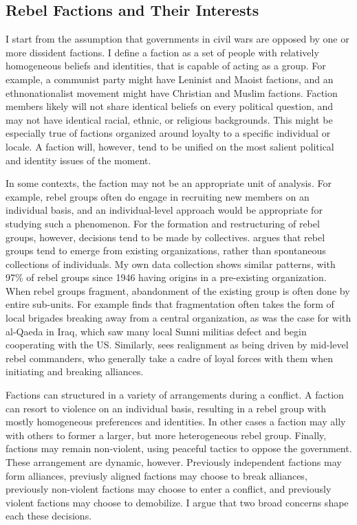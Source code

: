 \documentclass[12pt,]{book}
\begin{document}
\subsection{Rebel Factions and Their
Interests}\label{rebel-factions-and-their-interests}

I start from the assumption that governments in civil wars are opposed
by one or more dissident factions. I define a faction as a set of people
with relatively homogeneous beliefs and identities, that is capable of
acting as a group. For example, a communist party might have Leninist
and Maoist factions, and an ethnonationalist movement might have
Christian and Muslim factions. Faction members likely will not share
identical beliefs on every political question, and may not have
identical racial, ethnic, or religious backgrounds. This might be
especially true of factions organized around loyalty to a specific
individual or locale. A faction will, however, tend to be unified on the
most salient political and identity issues of the moment.

In some contexts, the faction may not be an appropriate unit of
analysis. For example, rebel groups often do engage in recruiting new
members on an individual basis, and an individual-level approach would
be appropriate for studying such a phenomenon. For the formation and
restructuring of rebel groups, however, decisions tend to be made by
collectives. \citet{Staniland2014} argues that rebel groups tend to
emerge from existing organizations, rather than spontaneous collections
of individuals. My own data collection shows similar patterns, with 97\%
of rebel groups since 1946 having origins in a pre-existing
organization. When rebel groups fragment, abandonment of the existing
group is often done by entire sub-units. For example
\citet{Staniland2014} finds that fragmentation often takes the form of
local brigades breaking away from a central organization, as was the
case for with al-Qaeda in Iraq, which saw many local Sunni militias
defect and begin cooperating with the US. Similarly,
\citet{Christia2012} sees realignment as being driven by mid-level rebel
commanders, who generally take a cadre of loyal forces with them when
initiating and breaking alliances.

Factions can structured in a variety of arrangements during a conflict.
A faction can resort to violence on an individual basis, resulting in a
rebel group with mostly homogeneous preferences and identities. In other
cases a faction may ally with others to former a larger, but more
heterogeneous rebel group. Finally, factions may remain non-violent,
using peaceful tactics to oppose the government. These arrangement are
dynamic, however. Previously independent factions may form alliances,
previusly aligned factions may choose to break alliances, previously
non-violent factions may choose to enter a conflict, and previously
violent factions may choose to demobilize. I argue that two broad
concerns shape each these decisions.
\end{document}
